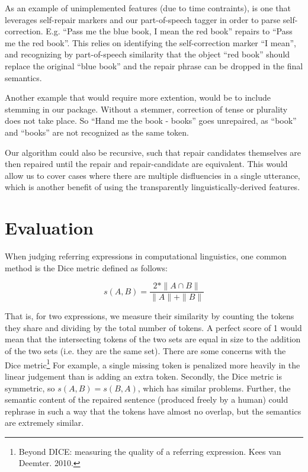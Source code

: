 \documentclass{article}
\begin{document}
\begin{flushleft}

  As an example of unimplemented features (due to time contraints), is one that leverages self-repair markers and our part-of-speech tagger in order to parse self-correction. E.g. ``Pass me the blue book, I mean the red book'' repairs to ``Pass me the red book''. This relies on identifying the self-correction marker ``I mean'', and recognizing by part-of-speech similarity that the object ``red book'' should replace the original ``blue book'' and the repair phrase can be dropped in the final semantics.
  
\end{flushleft}

\begin{flushleft}

  Another example that would require more extention, would be to include stemming in our package. Without a stemmer, correction of tense or plurality does not take place. So ``Hand me the book - books'' goes unrepaired, as ``book'' and ``books'' are not recognized as the same token.
  
\begin{flushleft}

  Our algorithm could also be recursive, such that repair candidates themselves are then repaired until the repair and repair-candidate are equivalent. This would allow us to cover cases where there are multiple disfluencies in a single utterance, which is another benefit of using the transparently linguistically-derived features.
  
\end{flushleft}

\section{Evaluation}

\begin{flushleft}
 
  When judging referring expressions in computational linguistics, one common method is the Dice metric defined as follows:

  $$s(A,B)=\frac{2*\| A\cap B\|}{\| A\| +\| B\| }$$

  That is, for two expressions, we measure their similarity by counting the tokens they share and dividing by the total number of tokens. A perfect score of 1 would mean that the intersecting tokens of the two sets are equal in size to the addition of the two sets (i.e. they are the same set). There are some concerns with the Dice metric\footnote{Beyond DICE: measuring the quality of a referring expression. Kees van Deemter. 2010.} For example, a single missing token is penalized more heavily in the linear judgement than is adding an extra token. Secondly, the Dice metric is symmetric, so $s(A, B) = s(B, A)$, which has similar problems. Further, the semantic content of the repaired sentence (produced freely by a human) could rephrase in such a way that the tokens have almost no overlap, but the semantics are extremely similar.


\end{flushleft}
\end{flushleft}
\end{document}
